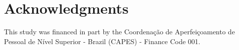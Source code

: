 \documentclass[10pt,journal,compsoc]{IEEEtran}
\begin{document}
\section*{Acknowledgments}
This study was financed in part by the Coordenação de Aperfeiçoamento de Pessoal de Nível Superior - Brazil (CAPES) - Finance Code 001.

{}
%
%
%
% 
\end{document}

